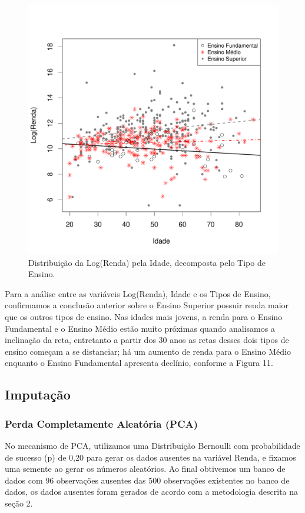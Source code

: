 \documentclass[]{article}
\begin{document}
\begin{figure}[H]

{\centering \includegraphics[width=0.6\linewidth]{p22-graf} 

}

\caption{Distribuição da Log(Renda) pela Idade, decomposta pelo Tipo de Ensino.}\label{fig:unnamed-chunk-18}
\end{figure}

Para a análise entre as variáveis Log(Renda), Idade e os Tipos de
Ensino, confirmamos a conclusão anterior sobre o Ensino Superior possuir
renda maior que os outros tipos de ensino. Nas idades mais jovens, a
renda para o Ensino Fundamental e o Ensino Médio estão muito próximas
quando analisamos a inclinação da reta, entretanto a partir dos 30 anos
as retas desses dois tipos de ensino começam a se distanciar; há um
aumento de renda para o Ensino Médio enquanto o Ensino Fundamental
apresenta declínio, conforme a Figura 11.

\subsection{Imputação}\label{imputacao}

\subsubsection{Perda Completamente Aleatória
(PCA)}\label{perda-completamente-aleatoria-pca}

No mecanismo de PCA, utilizamos uma Distribuição Bernoulli com
probabilidade de sucesso (p) de 0,20 para gerar os dados ausentes na
variável Renda, e fixamos uma semente ao gerar os números aleatórios. Ao
final obtivemos um banco de dados com 96 observações ausentes das 500
observações existentes no banco de dados, os dados ausentes foram
gerados de acordo com a metodologia descrita na seção 2.
\end{document}
